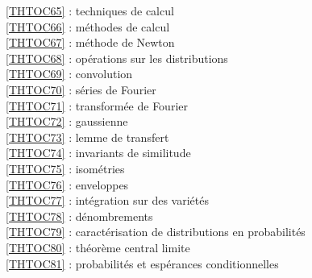 \ref {THTOC65} : techniques de calcul\\
\ref {THTOC66} : méthodes de calcul\\
\ref {THTOC67} : méthode de Newton\\
\ref {THTOC68} : opérations sur les distributions\\
\ref {THTOC69} : convolution\\
\ref {THTOC70} : séries de Fourier\\
\ref {THTOC71} : transformée de Fourier\\
\ref {THTOC72} : gaussienne\\
\ref {THTOC73} : lemme de transfert\\
\ref {THTOC74} : invariants de similitude\\
\ref {THTOC75} : isométries\\
\ref {THTOC76} : enveloppes\\
\ref {THTOC77} : intégration sur des variétés\\
\ref {THTOC78} : dénombrements\\
\ref {THTOC79} : caractérisation de distributions en probabilités\\
\ref {THTOC80} : théorème central limite\\
\ref {THTOC81} : probabilités et espérances conditionnelles\\

